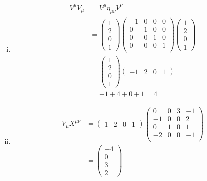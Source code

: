 \documentclass[11pt]{article}
\numberwithin{equation}{section}
\begin{document}
\begin{enumerate}[(a)]
\begin{enumerate}[(i)]
\item
\begin{align*}
V^{\mu}V_{\mu} &= V^{\mu}\eta_{\mu\nu}V^{\nu}\\
		&= \left(\begin{array}{c}
			1\\ 2\\ 0\\ 1
			\end{array}\right)
		\left(\begin{array}{cccc}
			-1 &0 &0 &0\\
			0 &1 &0 &0\\
			0 &0 &1 &0\\
			0 &0 &0 &1\\
		\end{array}\right)
		\left(\begin{array}{c}
			1\\ 2\\ 0\\ 1
			\end{array}\right)\\
		&=  \left(\begin{array}{c}
			1\\ 2\\ 0\\ 1
			\end{array}\right)
		  \left(\begin{array}{cccc}
			-1 &2 &0 &1
			\end{array}\right)\\
&= -1+4+0+1 = 4
\end{align*}

\item
\begin{align*}
V_{\mu}X^{\mu\nu} &= \left(\begin{array}{cccc}
			1 &2 &0 &1
			\end{array}\right)
			\left(\begin{array}{cccc}
				0 &0 &3 &-1\\
				-1 &0 &0 &2\\
				0 &1 &0 &1\\
				-2 &0 &0 &-1\\
			\end{array}\right)\\
&= \left(\begin{array}{c}
		-4\\ 0\\ 3\\ 2
	\end{array}\right)
\end{align*}
\end{enumerate}


\end{enumerate}
\end{document}
